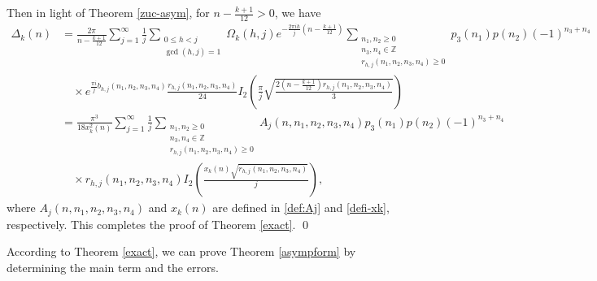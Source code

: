 \documentclass[12pt]{article}
\numberwithin{equation}{section}
\begin{document}
Then in light of Theorem \ref{zuc-asym}, for $n-\frac{k+1}{12}>0$, we have
\begin{align*}
\Delta_{k}(n) &= \frac{2\pi}{n-\frac{k+ 1}{12}} \sum_{j=1}^{\infty} \frac{1}{j} \sum_{\substack{0 \leq h < j \\ \gcd(h,j) = 1}}\Omega_{k}(h,j) e^{-\frac{2\pi i h}{j}\left(n-\frac{k+ 1}{12}\right)}
\sum_{\substack{n_1,n_2\geq 0 \\ n_3,n_4\in \mathbb{Z} \\r_{h,j}(n_1,n_2,n_3,n_4)\geq 0}}p_3(n_1)p(n_2)(-1)^{n_3+n_4}
\\
&\quad \times e^{\frac{\pi i}{j}b_{h,j}(n_1,n_2,n_3,n_4)}
\frac{r_{h,j}(n_1,n_2,n_3,n_4)}{24} I_{2} \left( \frac{\pi}{j} \sqrt{\frac{2(n-\frac{k+ 1}{12})r_{h,j}(n_1,n_2,n_3,n_4)}{3}} \right)
\\
&=\frac{ \pi^3}{18 x^2_{k}(n)}\sum_{j=1}^{\infty} \frac{1}{j}
\sum_{\substack{n_1,n_2\geq 0 \\ n_3,n_4\in \mathbb{Z} \\r_{h,j}(n_1,n_2,n_3,n_4)\geq 0}}A_{j}(n,n_1,n_2,n_3,n_4)p_3(n_1)p(n_2)(-1)^{n_3+n_4}
\\
&\quad \times r_{h,j}(n_1,n_2,n_3,n_4) I_{2} \left( \frac{x_{k}(n)\sqrt{r_{h,j}(n_1,n_2,n_3,n_4)}}{j}  \right),
\end{align*}
where $A_{j}(n,n_1,n_2,n_3,n_4)$ and $x_{k}(n)$ are defined in \eqref{def:Aj} and \eqref{defi-xk}, respectively.
This completes the proof of Theorem \ref{exact}. \qed

According to Theorem \ref{exact}, we can prove Theorem \ref{asympform} by determining the main term and the errors.
\end{document}
